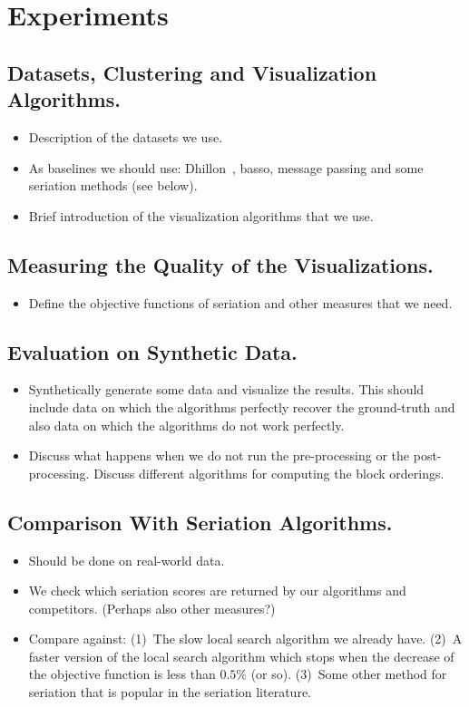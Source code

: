 \documentclass[twoside,leqno,twocolumn]{article}
\theoremstyle{definition}
\begin{document}
\section{Experiments}

\subsection{Datasets, Clustering and Visualization Algorithms.}
\begin{itemize}
	\item Description of the datasets we use.
	\item As baselines we should use: Dhillon~\cite{dhillon01coclustering},
		basso, message passing and some seriation methods (see below).
	\item Brief introduction of the visualization algorithms that we use.
\end{itemize}

\subsection{Measuring the Quality of the Visualizations.}
\begin{itemize}
	\item Define the objective functions of seriation and other measures that we
		need.
\end{itemize}

\subsection{Evaluation on Synthetic Data.}
\begin{itemize}
	\item Synthetically generate some data and visualize the results. This
		should include data on which the algorithms perfectly recover the
		ground-truth and also data on which the algorithms do not work
		perfectly.
	\item Discuss what happens when we do not run the pre-processing or the
		post-processing.  Discuss different algorithms for computing the block
		orderings.
\end{itemize}

\subsection{Comparison With Seriation Algorithms.}
\begin{itemize}
	\item Should be done on real-world data.
	\item We check which seriation scores are returned by our algorithms and
		competitors. (Perhaps also other measures?)
	\item Compare against: (1)~The slow local search algorithm we already have.
		(2)~A faster version of the local search algorithm which stops when the
			decrease of the objective function is less than $0.5\%$ (or so).
		(3)~Some other method for seriation that is popular in the seriation
			literature.
\end{itemize}
\end{document}
